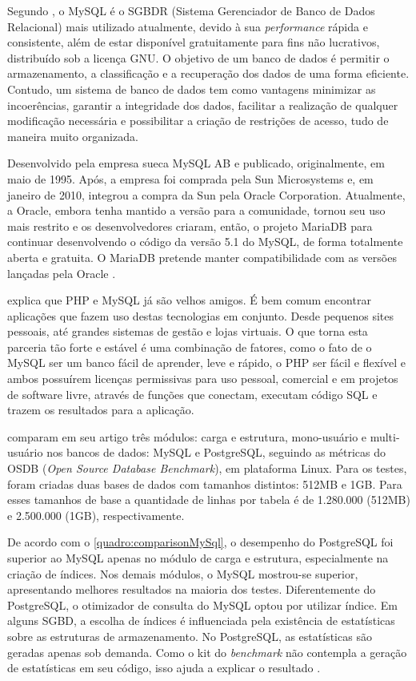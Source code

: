 Segundo , o MySQL é o SGBDR (Sistema Gerenciador de Banco de Dados Relacional) mais utilizado atualmente, devido à sua \textit{performance} rápida e consistente, além de estar disponível gratuitamente para fins não lucrativos, distribuído sob a licença GNU. O objetivo de um banco de dados é permitir o armazenamento, a classificação e a recuperação dos dados de uma forma eficiente. Contudo, um sistema de banco de dados tem como vantagens minimizar as incoerências, garantir a integridade dos dados, facilitar a realização de qualquer modificação necessária e possibilitar a criação de restrições de acesso, tudo de maneira muito organizada.

\newpage
Desenvolvido pela empresa sueca MySQL AB e publicado, originalmente, em maio de 1995. Após, a empresa foi comprada pela Sun Microsystems e, em janeiro de 2010, integrou a compra da Sun pela Oracle Corporation. Atualmente, a Oracle, embora tenha mantido a versão para a comunidade, tornou seu uso mais restrito e os desenvolvedores criaram, então, o projeto MariaDB para continuar desenvolvendo o código da versão 5.1 do MySQL, de forma totalmente aberta e gratuita. O MariaDB pretende manter compatibilidade com as versões lançadas pela Oracle \cite{mariadb}.

 explica que PHP e MySQL já são velhos amigos. É bem comum encontrar aplicações que fazem uso destas tecnologias em conjunto. Desde pequenos sites pessoais, até grandes sistemas de gestão e lojas virtuais. O que torna esta parceria tão forte e estável é uma combinação de fatores, como o fato de o MySQL ser um banco fácil de aprender, leve e rápido, o PHP ser fácil e flexível e ambos possuírem licenças permissivas para uso pessoal, comercial e em projetos de software livre, através de funções que conectam, executam código SQL e trazem os resultados para a aplicação.

 comparam em seu artigo três módulos: carga e estrutura, mono-usuário e multi-usuário nos bancos de dados: MySQL e PostgreSQL, seguindo as métricas do OSDB (\textit{Open Source Database Benchmark}), em plataforma Linux. Para os testes, foram criadas duas bases de dados com tamanhos distintos: 512MB e 1GB. Para esses tamanhos de base a quantidade de linhas por tabela é de 1.280.000 (512MB) e 2.500.000 (1GB), respectivamente.

De acordo com o \autoref{quadro:comparisonMySql}, o desempenho do PostgreSQL foi superior ao MySQL apenas no módulo de carga e estrutura, especialmente na criação de índices. Nos demais módulos, o MySQL mostrou-se superior, apresentando melhores resultados na maioria dos testes. Diferentemente do PostgreSQL, o otimizador de consulta do MySQL optou por utilizar índice. Em alguns SGBD, a escolha de índices é influenciada pela existência de estatísticas sobre as estruturas de armazenamento. No PostgreSQL, as estatísticas são geradas apenas sob demanda. Como o kit do \textit{benchmark} não contempla a geração de estatísticas em seu código, isso ajuda a explicar o resultado \cite{mysql:ufpe}.

